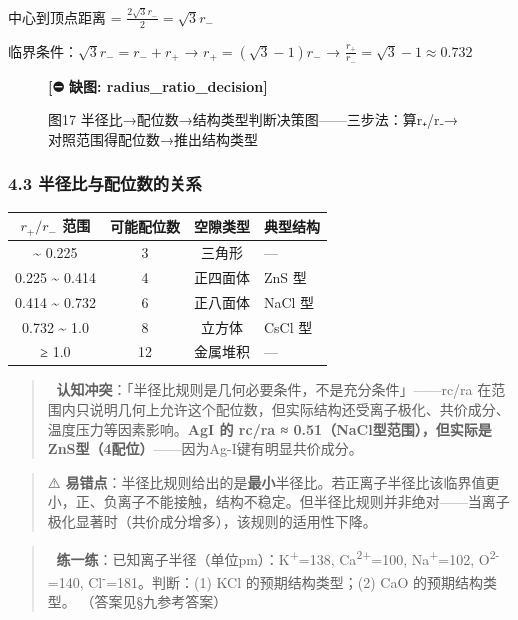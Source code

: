 \documentclass[a4paper,11pt]{ctexart}
\newcounter{none}
\begin{document}
中心到顶点距离 = \(\frac{2\sqrt{3}r_-}{2} = \sqrt{3}r_-\)

临界条件：\(\sqrt{3}r_- = r_- + r_+\) → \(r_+ = (\sqrt{3} - 1)r_-\) → \(\boxed{\frac{r_+}{r_-} = \sqrt{3} - 1 \approx 0.732}\)

\begin{figure}[H]\centering
\textbf{[⛔ 缺图: radius_ratio_decision]}
\caption{图17 半径比→配位数→结构类型判断决策图——三步法：算r₊/r₋→对照范围得配位数→推出结构类型}
\end{figure}

\subsubsection{4.3 半径比与配位数的关系}\label{ux534aux5f84ux6bd4ux4e0eux914dux4f4dux6570ux7684ux5173ux7cfb}

{\def\LTcaptype{none} %
\begin{longtable}[]{@{}cccl@{}}
\toprule\noalign{}
\(r_+/r_-\) 范围 & 可能配位数 & 空隙类型 & 典型结构 \\
\midrule\noalign{}
\endhead
\bottomrule\noalign{}
\endlastfoot
0.155 \textasciitilde{} 0.225 & 3 & 三角形 & --- \\
0.225 \textasciitilde{} 0.414 & 4 & 正四面体 & ZnS 型 \\
0.414 \textasciitilde{} 0.732 & 6 & 正八面体 & NaCl 型 \\
0.732 \textasciitilde{} 1.0 & 8 & 立方体 & CsCl 型 \\
≥ 1.0 & 12 & 金属堆积 & --- \\
\end{longtable}
}

\begin{quote}
🧠 \textbf{认知冲突}：「半径比规则是几何必要条件，不是充分条件」------rc/ra 在范围内只说明几何上允许这个配位数，但实际结构还受离子极化、共价成分、温度压力等因素影响。\textbf{AgI 的 rc/ra ≈ 0.51（NaCl型范围），但实际是ZnS型（4配位）}------因为Ag-I键有明显共价成分。
\end{quote}

\begin{quote}
⚠️ \textbf{易错点}：半径比规则给出的是\textbf{最小}半径比。若正离子半径比该临界值更小，正、负离子不能接触，结构不稳定。但半径比规则并非绝对------当离子极化显著时（共价成分增多），该规则的适用性下降。
\end{quote}

\begin{quote}
📝 \textbf{练一练}：已知离子半径（单位pm）：K\textsuperscript{+}=138, Ca\textsuperscript{2+}=100, Na\textsuperscript{+}=102, O\textsuperscript{2-}=140, Cl\textsuperscript{-}=181。判断：(1) KCl 的预期结构类型；(2) CaO 的预期结构类型。
（答案见§九参考答案）
\end{quote}
\end{document}

